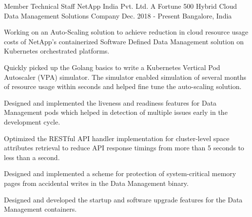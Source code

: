 

\begin{cventries}

  \expentry
    {Member Technical Staff} %
    {NetApp India Pvt. Ltd.} %
    {A Fortune 500 Hybrid Cloud Data Management Solutions Company} %
    {Dec. 2018 - Present} %
    {Bangalore, India} %
    {
      \begin{cvitems} %
        \item {Working on an Auto-Scaling solution to achieve reduction in cloud resource usage costs of NetApp's containerized Software Defined Data Management solution on Kubernetes orchestrated platforms.}
        \item {Quickly picked up the Golang basics to write a Kubernetes Vertical Pod Autoscaler (VPA) simulator. The simulator enabled simulation of several months of resource usage within seconds and helped fine tune the auto-scaling solution.}
        \item {Designed and implemented the liveness and readiness features for Data Management pods which helped in detection of multiple issues early in the development cycle.}
        \item {Optimized the RESTful API handler implementation for cluster-level space attributes retrieval to reduce API response timings from more than 5 seconds to less than a second.}
        \item {Designed and implemented a scheme for protection of system-critical memory pages from accidental writes in the Data Management binary.}
        \item {Designed and developed the startup and software upgrade features for the Data Management containers.}
      \end{cvitems}
    }


\end{cventries}
